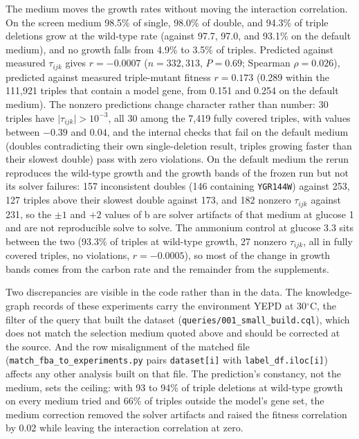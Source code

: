 The medium moves the growth rates without moving the interaction correlation. On the
screen medium 98.5\% of single, 98.0\% of double, and 94.3\% of triple deletions grow at
the wild-type rate (against 97.7, 97.0, and 93.1\% on the default medium), and no growth
falls from 4.9\% to 3.5\% of triples. Predicted against measured $\tau_{ijk}$ gives
$r=-0.0007$ ($n=332{,}313$, $P=0.69$; Spearman $\rho=0.026$), predicted against measured
triple-mutant fitness $r=0.173$ (0.289 within the 111,921 triples that contain a model
gene, from 0.151 and 0.254 on the default medium). The nonzero predictions change character
rather than number: 30 triples have $\lvert\tau_{ijk}\rvert>10^{-3}$, all 30 among the
7,419 fully covered triples, with values between $-0.39$ and $0.04$, and the internal
checks that fail on the default medium (doubles contradicting their own single-deletion
result, triples growing faster than their slowest double) pass with zero violations. On
the default medium the rerun reproduces the wild-type growth and the growth bands of the
frozen run but not its solver failures: 157 inconsistent doubles (146 containing
\texttt{YGR144W}) against 253, 127 triples above their slowest double against 173, and
182 nonzero $\tau_{ijk}$ against 231, so the $\pm 1$ and $+2$ values of
b are solver artifacts of that medium at glucose 1 and are not
reproducible solve to solve. The ammonium control at glucose 3.3 sits between the two
(93.3\% of triples at wild-type growth, 27 nonzero $\tau_{ijk}$, all in fully covered
triples, no violations, $r=-0.0005$), so most of the change in growth bands comes from the
carbon rate and the remainder from the supplements.

 Two discrepancies are visible in the code rather than in the data. The
knowledge-graph records of these experiments carry the environment YEPD at 30$^{\circ}$C,
the filter of the query that built the dataset (\texttt{queries/001\_small\_build.cql}),
which does not match the selection medium quoted above and should be corrected at the
source. And the row misalignment of the matched file
(\texttt{match\_fba\_to\_experiments.py} pairs \texttt{dataset[i]} with
\texttt{label\_df.iloc[i]}) affects any other analysis built on that file. The prediction's
constancy, not the medium, sets the ceiling: with 93 to 94\% of triple deletions at
wild-type growth on every medium tried and 66\% of triples outside the model's gene set,
the medium correction removed the solver artifacts and raised the fitness correlation by
0.02 while leaving the interaction correlation at zero.

